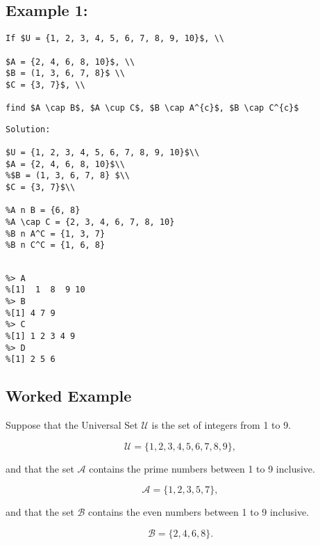 \subsection*{Example 1: }
\begin{verbatim}
If $U = {1, 2, 3, 4, 5, 6, 7, 8, 9, 10}$, \\

$A = {2, 4, 6, 8, 10}$, \\
$B = (1, 3, 6, 7, 8}$ \\
$C = {3, 7}$, \\

find $A \cap B$, $A \cup C$, $B \cap A^{c}$, $B \cap C^{c}$
\end{verbatim}
\begin{verbatim}
Solution: 

$U = {1, 2, 3, 4, 5, 6, 7, 8, 9, 10}$\\
$A = {2, 4, 6, 8, 10}$\\
%$B = (1, 3, 6, 7, 8} $\\
$C = {3, 7}$\\

%A n B = {6, 8}
%A \cap C = {2, 3, 4, 6, 7, 8, 10}
%B n A^C = {1, 3, 7}
%B n C^C = {1, 6, 8}
\end{verbatim}
\begin{verbatim}

%> A
%[1]  1  8  9 10
%> B
%[1] 4 7 9
%> C
%[1] 1 2 3 4 9
%> D
%[1] 2 5 6
\end{verbatim}







\subsection*{Worked Example}

Suppose that the Universal Set $\mathcal{U}$ is the set of integers from 1 to 9.

\[ \mathcal{U} = \{1,2,3,4,5,6,7,8,9\}, \]

and that the set $\mathcal{A}$ contains the prime numbers between 1 to 9 inclusive.


\[ \mathcal{A} = \{1,2,3,5,7\}, \]


and that the set $\mathcal{B}$ contains the even numbers between 1 to 9 inclusive.


\[ \mathcal{B} = \{2,4,6,8\}. \]



